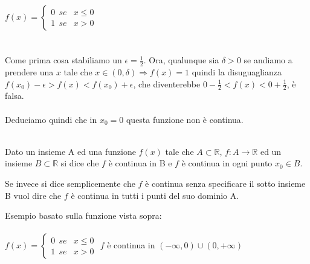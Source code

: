 $
  f(x)=\begin{cases}
    0 \: \: se & x \leq 0\\
    1 \: \: se & x > 0
  \end{cases}
$\\ \\ \\
Come prima cosa stabiliamo un $\epsilon = \frac{1}{2}$. Ora, qualunque sia $\delta > 0$ se andiamo a prendere una $x$ tale che $x \in (0, \delta) \Longrightarrow f(x) = 1$ quindi la disuguaglianza $f(x_0) - \epsilon > f(x) < f(x_0) + \epsilon$, che diventerebbe $0 - \frac{1}{2} < f(x) < 0 + \frac{1}{2}$, è falsa. \\ \\
Deduciamo quindi che in $x_0 = 0$ questa funzione non è continua. \\ \\

\begin{definition}
    Dato un insieme A ed una funzione $f(x)$ tale che $A \subset \mathbb{R}$, $f: A \longrightarrow \mathbb{R}$ ed un insieme $B \subset \mathbb{R}$ si dice che $f$ è continua in B e $f$ è continua in ogni punto $x_0 \in B$.
\end{definition}
Se invece si dice semplicemente che $f$ è continua senza specificare il sotto insieme B vuol dire che $f$ è continua in tutti i punti del suo dominio A.
\begin{example}
    Esempio basato sulla funzione vista sopra:\\\\
    $
      f(x)=\begin{cases}
        0 \: \: se & x \leq 0\\
        1 \: \: se & x > 0
      \end{cases}
    $ \hspace{1cm}
    $f$ è continua in $(-\infty, 0) \cup (0, +\infty)$ 
\end{example}

